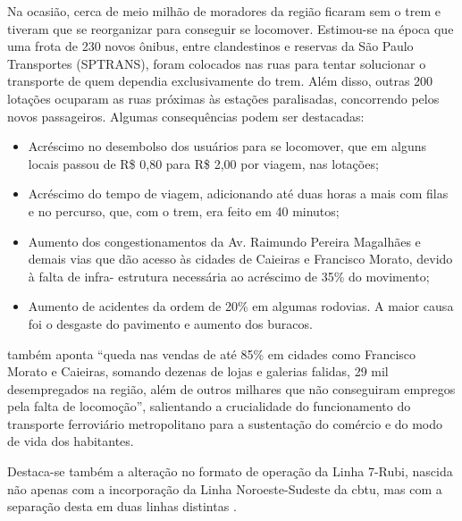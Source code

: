     \begin{citacao}
    	Na ocasião, cerca de meio milhão de moradores da região ficaram sem o trem e tiveram que se reorganizar para conseguir se locomover. Estimou-se na época que uma frota de 230 novos ônibus, entre clandestinos e reservas da São Paulo Transportes (SPTRANS), foram colocados nas ruas para tentar solucionar o transporte de quem dependia exclusivamente do trem. Além disso, outras 200 lotações ocuparam as ruas próximas às estações paralisadas, concorrendo pelos novos passageiros. Algumas consequências podem ser destacadas:
    	
    	\begin{itemize}[leftmargin=\leftskip+-]
    		\item Acréscimo no desembolso dos usuários para se locomover, que em alguns locais
    	passou de R\$ 0,80 para R\$ 2,00 por viagem, nas lotações;
	    	\item Acréscimo do tempo de viagem, adicionando até duas horas a mais com filas e no
    	percurso, que, com o trem, era feito em 40 minutos;
	    	\item Aumento dos congestionamentos da Av. Raimundo Pereira Magalhães e demais vias
    	que dão acesso às cidades de Caieiras e Francisco Morato, devido à falta de infra-
    	estrutura necessária ao acréscimo de 35\% do movimento;
		    \item Aumento de acidentes da ordem de 20\% em algumas rodovias. A maior causa foi o
    	desgaste do pavimento e aumento dos buracos.
		\end{itemize}
    \end{citacao}
    
     também aponta ``queda nas vendas de até 85\% em cidades como Francisco Morato e Caieiras, somando dezenas de lojas e galerias falidas, 29 mil desempregados na região, além de outros milhares que não conseguiram empregos pela falta de locomoção'', salientando a crucialidade do funcionamento do transporte ferroviário metropolitano para a sustentação do comércio e do modo de vida dos habitantes.
    
    Destaca-se também a alteração no formato de operação da Linha 7-Rubi, nascida não apenas com a incorporação da Linha Noroeste-Sudeste da \gls{cbtu}, mas com a separação desta em duas linhas distintas \cite[p.50]{ferreira2010a} \cite[p.223]{stefani2007a}.

